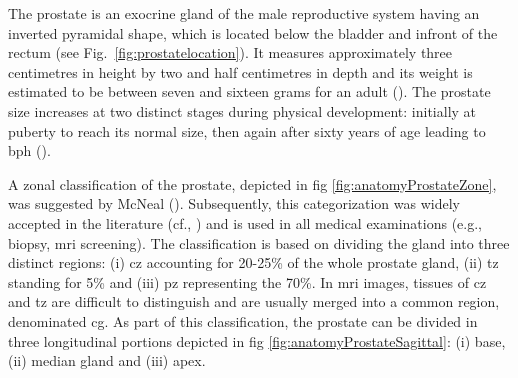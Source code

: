 The prostate is an exocrine gland of the male reproductive system having an inverted pyramidal shape, which is located below the bladder and infront of the rectum (see Fig.~\ref{fig:prostatelocation}).
It measures approximately three centimetres in height by two and half centimetres in depth and its weight is estimated to be between seven and sixteen grams for an adult (\cite{Leissner1979}). The prostate size increases at two distinct stages during physical development: initially at puberty to reach its normal size, then again after sixty years of age leading to \ac{bph} (\cite{Parfait2010}).

A zonal classification of the prostate, depicted in \acs{fig} \ref{fig:anatomyProstateZone}, was suggested by McNeal (\cite{McNeal1981}). Subsequently, this categorization was widely accepted in the literature (cf., \cite{Hricak1987,Villers1991,Coakley2000,Parfait2010}) and is used in all medical examinations (e.g., biopsy, \ac{mri} screening). The classification is based on dividing the gland into three distinct regions: (i) \ac{cz} accounting for 20-25\% of the whole prostate gland, (ii) \ac{tz} standing for 5\% and (iii) \ac{pz} representing the 70\%. In \ac{mri} images, tissues of \ac{cz} and \ac{tz} are difficult to distinguish and are usually merged into a common region, denominated \ac{cg}.
As part of this classification, the prostate can be divided in three longitudinal portions depicted in \acs{fig} \ref{fig:anatomyProstateSagittal}: (i) base, (ii) median gland and (iii) apex.





